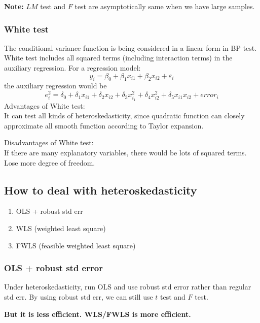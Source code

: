 \documentclass[12pt]{article}
\begin{document}
 {\textbf {Note:}} $ LM $ test and $ F $ test are asymptotically same when we have
 large samples.

\subsubsection{White test}
The conditional variance function is being considered in a linear form in BP test.
White test includes all squared terms (including interaction terms) in the auxiliary
regression.
For a regression model:
\begin{equation*}
y_{i} = \beta_0 + \beta_1x_{i 1} + \beta_2x_{i 2} + \varepsilon_{i}
\end{equation*}
the auxiliary regression would be
\begin{equation*}
e_{i}^{2} = \delta_0 + \delta_1 x_{i 1} + \delta_2x_{i 2} + \delta_3x_{i_1}^{2} + 
\delta_4x_{i 2}^{2} + \delta_5x_{i 1}x_{i 2} + error_{i}
\end{equation*}
Advantages of White test:\\
It can test all kinds of heteroskedasticity, since quadratic function can closely 
approximate all smooth function according to Taylor expansion.

Disadvantages of White test:\\
If there are many explanatory variables, there would be lots of squared terms. Lose
more degree of freedom.






\subsection{How to deal with heteroskedasticity}
\begin{enumerate}
\item OLS + robust std err
\item WLS (weighted least square)
\item FWLS (feasible weighted least square)
\end{enumerate}

\subsubsection{OLS + robust std error}
Under heteroskedasticity, run OLS and use robust std error rather than regular std err.
By using robust std err, we can still use $ t $ test and $ F $ test.

{\textbf {But it is less efficient. WLS/FWLS is more efficient.}}









\end{document}
